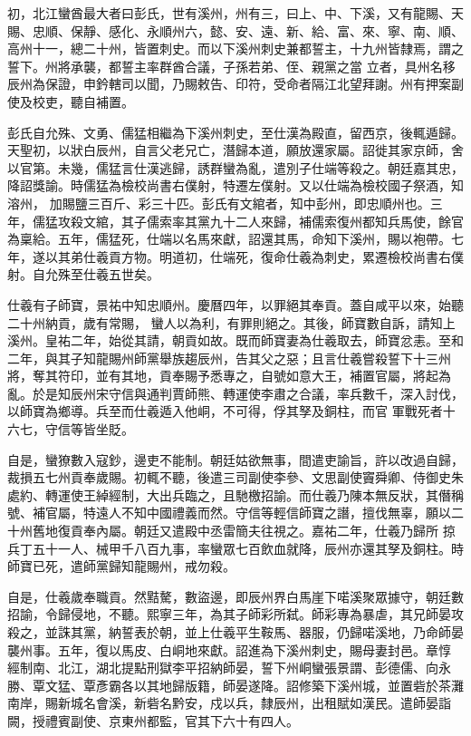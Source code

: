 \begin{pinyinscope}
 初，北江蠻酋最大者曰彭氏，世有溪州，州有三，曰上、中、下溪，又有龍賜、天賜、忠順、保靜、感化、永順州六，懿、安、遠、新、給、富、來、寧、南、順、高州十一，總二十州，皆置刺史。而以下溪州刺史兼都誓主，十九州皆隸焉，謂之誓下。州將承襲，都誓主率群酋合議，子孫若弟、侄、親黨之當
 立者，具州名移辰州為保證，申鈐轄司以聞，乃賜敕告、印符，受命者隔江北望拜謝。州有押案副使及校吏，聽自補置。



 彭氏自允殊、文勇、儒猛相繼為下溪州刺史，至仕漢為殿直，留西京，後輒遁歸。天聖初，以狀白辰州，自言父老兄亡，潛歸本道，願放還家屬。詔徙其家京師，舍以官第。未幾，儒猛言仕漢逃歸，誘群蠻為亂，遣別子仕端等殺之。朝廷嘉其忠，降詔獎諭。時儒猛為檢校尚書右僕射，特遷左僕射。又以仕端為檢校國子祭酒，知溶州，
 加賜鹽三百斤、彩三十匹。彭氏有文綰者，知中彭州，即忠順州也。三年，儒猛攻殺文綰，其子儒索率其黨九十二人來歸，補儒索復州都知兵馬使，餘官為稟給。五年，儒猛死，仕端以名馬來獻，詔還其馬，命知下溪州，賜以袍帶。七年，遂以其弟仕羲貢方物。明道初，仕端死，復命仕羲為刺史，累遷檢校尚書右僕射。自允殊至仕羲五世矣。



 仕羲有子師寶，景祐中知忠順州。慶曆四年，以罪絕其奉貢。蓋自咸平以來，始聽二十州納貢，歲有常賜，
 蠻人以為利，有罪則絕之。其後，師寶數自訴，請知上溪州。皇祐二年，始從其請，朝貢如故。既而師寶妻為仕羲取去，師寶忿恚。至和二年，與其子知龍賜州師黨舉族趨辰州，告其父之惡；且言仕羲嘗殺誓下十三州將，奪其符印，並有其地，貢奉賜予悉專之，自號如意大王，補置官屬，將起為亂。於是知辰州宋守信與通判賈師熊、轉運使李肅之合議，率兵數千，深入討伐，以師寶為鄉導。兵至而仕羲遁入他峒，不可得，俘其孥及銅柱，而官
 軍戰死者十六七，守信等皆坐貶。



 自是，蠻獠數入寇鈔，邊吏不能制。朝廷姑欲無事，間遣吏諭旨，許以改過自歸，裁損五七州貢奉歲賜。初輒不聽，後遣三司副使李參、文思副使竇舜卿、侍御史朱處約、轉運使王綽經制，大出兵臨之，且馳檄招諭。而仕羲乃陳本無反狀，其僭稱號、補官屬，特遠人不知中國禮義而然。守信等輕信師寶之譖，擅伐無辜，願以二十州舊地復貢奉內屬。朝廷又遣殿中丞雷簡夫往視之。嘉祐二年，仕羲乃歸所
 掠兵丁五十一人、械甲千八百九事，率蠻眾七百飲血就降，辰州亦還其孥及銅柱。時師寶已死，遣師黨歸知龍賜州，戒勿殺。



 自是，仕羲歲奉職貢。然黠驁，數盜邊，即辰州界白馬崖下喏溪聚眾據守，朝廷數招諭，令歸侵地，不聽。熙寧三年，為其子師彩所弑。師彩專為暴虐，其兄師晏攻殺之，並誅其黨，納誓表於朝，並上仕羲平生鞍馬、器服，仍歸喏溪地，乃命師晏襲州事。五年，復以馬皮、白峒地來獻。詔進為下溪州刺史，賜母妻封邑。章惇
 經制南、北江，湖北提點刑獄李平招納師晏，誓下州峒蠻張景謂、彭德儒、向永勝、覃文猛、覃彥霸各以其地歸版籍，師晏遂降。詔修築下溪州城，並置砦於茶灘南岸，賜新城名會溪，新砦名黔安，戍以兵，隸辰州，出租賦如漢民。遣師晏詣闕，授禮賓副使、京東州都監，官其下六十有四人。




\end{pinyinscope}
